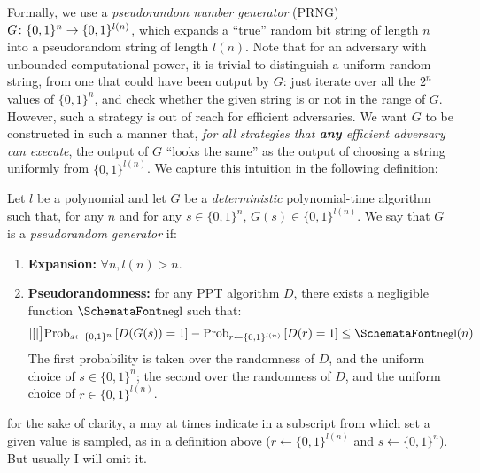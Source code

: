   Formally, we use a \emph{pseudorandom number generator} (PRNG) $G\colon \{0, 1\}^n \rightarrow \{0, 1\}^{l(n)}$, which expands a ``true'' random bit string of length $n$ into a pseudorandom string of length $l(n)$. Note that for an adversary with unbounded computational power, it is trivial to distinguish a uniform random string, from one that could have been output by $G$: just iterate over all the $2^n$ values of $\{0, 1\}^n$, and check whether the given string is or not in the range of $G$. However, such a strategy is out of reach for efficient adversaries. We want $G$ to be constructed in such a manner that, \emph{for all strategies that \textbf{any} efficient adversary can execute}, the output of $G$ ``looks the same'' as the output of choosing a string uniformly from $\{0, 1\}^{l(n)}$. We capture this intuition in the following definition:
  \begin{definition}
    \label{def:prng}
    Let $l$ be a polynomial and let $G$ be a \emph{deterministic} polynomial-time algorithm such that, for any $n$ and for any $s\in \{0, 1\}^n$, $G(s)\in \{0, 1\}^{l(n)}$. We say that $G$ is a \emph{pseudorandom generator} if:
    \begin{enumerate}
      \item \textbf{Expansion:} $\forall n, l(n) > n$.
      \item \textbf{Pseudorandomness:} for any PPT algorithm $D$, there exists a negligible function $\myemph{negl}$ such that:
        \begin{equation}
          \abs*[\big]{\textup{Prob}_{s \leftarrow \{0, 1\}^{n}}\left[D(G(s)) = 1\right] - \textup{Prob}_{r \leftarrow \{0, 1\}^{l(n)}}\left[D(r) = 1\right]} \le \myemph{negl}(n)
        \end{equation}
        The first probability is taken over the randomness of $D$, and the uniform choice of $s\in \{0, 1\}^n$; the second over the randomness of $D$, and the uniform choice of $r\in \{0, 1\}^{l(n)}$.
    \end{enumerate}
  \end{definition}

   for the sake of clarity, a may at times indicate in a subscript from which set a given value is sampled, as in a definition above ($r \leftarrow \{0, 1\}^{l(n)}$ and $s \leftarrow \{0, 1\}^{n}$). But usually I will omit it.

